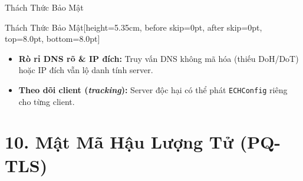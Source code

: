 \documentclass[aspectratio=169, 10pt]{beamer}
\begin{document}
\begin{frame}{Thách Thức Bảo Mật}
	\begin{accentcard}[uetblue]{Thách Thức Bảo Mật}[height=5.35cm, before skip=0pt, after skip=0pt, top=8.0pt, bottom=8.0pt]
		\raggedright
		\setlength{\leftmargini}{14pt}
		\begin{itemize}\setlength{\itemsep}{14pt}\setlength{\topsep}{6pt}\fontsize{7.5pt}{11.0pt}\selectfont
			\item \textbf{Rò rỉ DNS rõ \& IP đích:} Truy vấn DNS không mã hóa (thiếu DoH/DoT) hoặc IP đích vẫn lộ danh tính server.
			\item \textbf{Theo dõi client (\textit{tracking}):} Server độc hại có thể phát \texttt{ECHConfig} riêng cho từng client.
		\end{itemize}
	\end{accentcard}
\end{frame}

\section{10. Mật Mã Hậu Lượng Tử (PQ-TLS)}
\end{document}
